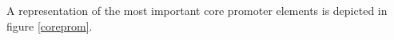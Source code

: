 
  

A representation of the most important core promoter elements is depicted in figure \ref{coreprom}. 


